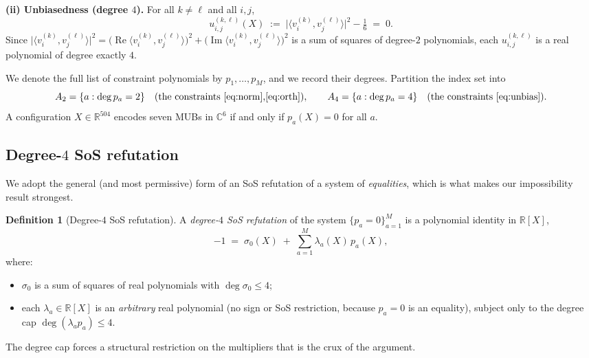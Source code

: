 \documentclass{amsart}
\theoremstyle{definition}
\newtheorem{definition}{Definition}
\begin{document}
\medskip
\noindent\textbf{(ii) Unbiasedness (degree $4$).} For all $k\ne\ell$ and all $i,j$,
\begin{equation}\label{eq:unbias}
u^{(k,\ell)}_{i,j}(X)\;:=\;\bigl|\langle v^{(k)}_i,v^{(\ell)}_j\rangle\bigr|^2-\tfrac16\;=\;0 .
\end{equation}
Since $\bigl|\langle v^{(k)}_i,v^{(\ell)}_j\rangle\bigr|^2
=\bigl(\operatorname{Re}\langle v^{(k)}_i,v^{(\ell)}_j\rangle\bigr)^2
+\bigl(\operatorname{Im}\langle v^{(k)}_i,v^{(\ell)}_j\rangle\bigr)^2$ is a sum of squares of
degree-$2$ polynomials, each $u^{(k,\ell)}_{i,j}$ is a real polynomial of degree exactly $4$.

We denote the full list of constraint polynomials by $p_1,\dots,p_M$, and we record their
degrees. Partition the index set into
\[
A_2=\{a:\deg p_a=2\}\quad(\text{the constraints \eqref{eq:norm},\eqref{eq:orth}}),
\qquad
A_4=\{a:\deg p_a=4\}\quad(\text{the constraints \eqref{eq:unbias}}).
\]
A configuration $X\in\mathbb{R}^{504}$ encodes seven MUBs in $\mathbb{C}^6$ if and only if
$p_a(X)=0$ for all $a$.

\subsection{Degree-$4$ SoS refutation}
We adopt the general (and most permissive) form of an SoS refutation of a system of
\emph{equalities}, which is what makes our impossibility result strongest.

\begin{definition}[Degree-$4$ SoS refutation]\label{def:refutation}
A \emph{degree-$4$ SoS refutation} of the system $\{p_a=0\}_{a=1}^M$ is a polynomial identity
in $\mathbb{R}[X]$,
\begin{equation}\label{eq:refutation}
-1\;=\;\sigma_0(X)\;+\;\sum_{a=1}^{M}\lambda_a(X)\,p_a(X),
\end{equation}
where:
\begin{itemize}
\item $\sigma_0$ is a sum of squares of real polynomials with $\deg\sigma_0\le 4$;
\item each $\lambda_a\in\mathbb{R}[X]$ is an \emph{arbitrary} real polynomial (no sign or SoS
restriction, because $p_a=0$ is an equality), subject only to the degree cap
$\deg(\lambda_a p_a)\le 4$.
\end{itemize}
\end{definition}

The degree cap forces a structural restriction on the multipliers that is the crux of the
argument.
\end{document}
